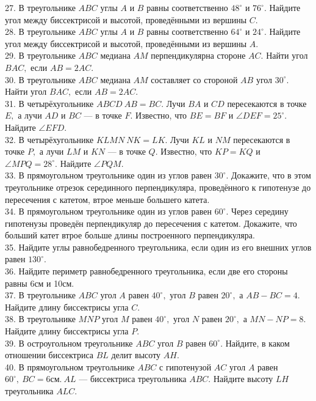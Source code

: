\documentclass[12pt]{article}
\begin{document}
27. В треугольнике $ABC$ углы $A$ и $B$ равны соответственно $48^\circ$ и $76^\circ.$ Найдите угол между биссектрисой и высотой, проведёнными из вершины $C.$\\
28. В треугольнике $ABC$ углы $A$ и $B$ равны соответственно $64^\circ$ и $24^\circ.$ Найдите угол между биссектрисой и высотой, проведёнными из вершины $A.$\\
29. В треугольнике $ABC$ медиана $AM$ перпендикулярна стороне $AC.$ Найти угол $BAC,$ если $AB=2AC.$\\
30. В треугольнике $ABC$ медиана $AM$ составляет со стороной $AB$ угол $30^\circ.$ Найти угол $BAC,$ если $AB=2AC.$\\
31. В четырёхугольнике $ABCD\ AB=BC.$ Лучи $BA$ и $CD$ пересекаются в точке $E,$ а лучи $AD$ и $BC$ --- в точке $F.$ Известно, что $BE=BF$ и $\angle DEF=25^\circ.$ Найдите $\angle EFD.$\\
32. В четырёхугольнике $KLMN\ NK=LK.$ Лучи $KL$ и $NM$ пересекаются в точке $P,$ а лучи $LM$ и $KN$ --- в точке $Q.$ Известно, что $KP=KQ$ и $\angle MPQ=28^\circ.$ Найдите $\angle PQM.$\\
33. В прямоугольном треугольнике один из углов равен $30^\circ.$ Докажите, что в этом треугольнике отрезок серединного перпендикуляра, проведённого к гипотенузе до пересечения с катетом, втрое меньше большего катета.\\
34. В прямоугольном треугольнике один из углов равен $60^\circ.$ Через середину гипотенузы проведён перпендикуляр до пересечения с катетом. Докажите, что больший катет втрое больше длины построенного перпендикуляра.\\
35. Найдите углы равнобедренного треугольника, если один из его внешних углов равен $130^\circ.$\\
36. Найдите периметр равнобедренного треугольника, если две его стороны равны 6см и 10см.\\
37. В треугольнике $ABC$ угол $A$ равен $40^\circ,$ угол $B$ равен $20^\circ,$ а $AB-BC=4.$  Найдите длину биссектрисы угла $C.$\\
38. В треугольнике $MNP$ угол $M$ равен $40^\circ,$ угол $N$ равен $20^\circ,$ а $MN-NP=8.$  Найдите длину биссектрисы угла $P.$\\
39. В остроугольном треугольнике $ABC$ угол $B$ равен $60^\circ.$ Найдите, в каком отношении биссектриса $BL$ делит высоту $AH.$\\
40. В прямоугольном треугольнике $ABC$ с гипотенузой $AC$ угол $A$ равен $60^\circ,\
BC=6\text{см}.\ AL$ --- биссектриса треугольника $ABC.$ Найдите высоту $LH$ треугольника $ALC.$\\
\end{document}
